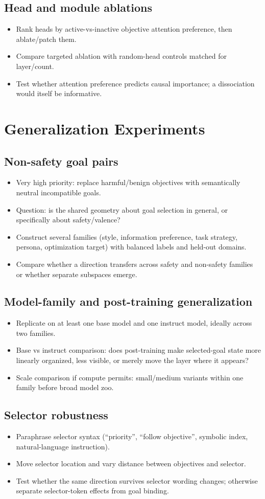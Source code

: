 \documentclass[10pt]{article}
\newcommand{\paperidea}[1]{\item #1}
\begin{document}
\subsection{Head and module ablations}
\begin{itemize}
  \paperidea{Rank heads by active-vs-inactive objective attention preference, then ablate/patch them.}
  \paperidea{Compare targeted ablation with random-head controls matched for layer/count.}
  \paperidea{Test whether attention preference predicts causal importance; a dissociation would itself be informative.}
\end{itemize}

\section{Generalization Experiments}
\subsection{Non-safety goal pairs}
\begin{itemize}
  \paperidea{Very high priority: replace harmful/benign objectives with semantically neutral incompatible goals.}
  \paperidea{Question: is the shared geometry about goal selection in general, or specifically about safety/valence?}
  \paperidea{Construct several families (style, information preference, task strategy, persona, optimization target) with balanced labels and held-out domains.}
  \paperidea{Compare whether a direction transfers across safety and non-safety families or whether separate subspaces emerge.}
\end{itemize}

\subsection{Model-family and post-training generalization}
\begin{itemize}
  \paperidea{Replicate on at least one base model and one instruct model, ideally across two families.}
  \paperidea{Base vs instruct comparison: does post-training make selected-goal state more linearly organized, less visible, or merely move the layer where it appears?}
  \paperidea{Scale comparison if compute permits: small/medium variants within one family before broad model zoo.}
\end{itemize}

\subsection{Selector robustness}
\begin{itemize}
  \paperidea{Paraphrase selector syntax (``priority'', ``follow objective'', symbolic index, natural-language instruction).}
  \paperidea{Move selector location and vary distance between objectives and selector.}
  \paperidea{Test whether the same direction survives selector wording changes; otherwise separate selector-token effects from goal binding.}
\end{itemize}
\end{document}
